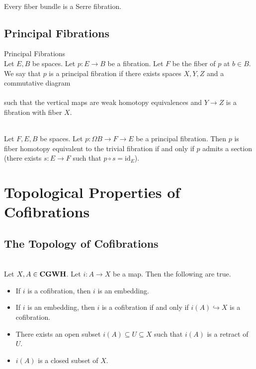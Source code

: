\documentclass[a4paper]{article}
\begin{document}
\begin{lmm}{}{}\\
Every fiber bundle is a Serre fibration. 
\end{lmm}

\subsection{Principal Fibrations}
\begin{defn}{Principal Fibrations}{}\\
Let $E,B$ be spaces. Let $p:E\to B$ be a fibration. Let $F$ be the fiber of $p$ at $b\in B$. We say that $p$ is a principal fibration if there exists spaces $X,Y,Z$ and a commutative diagram \\
\\
such that the vertical maps are weak homotopy equivalences and $Y\to Z$ is a fibration with fiber $X$. 
\end{defn}

\begin{prp}{}{}\\
Let $F,E,B$ be spaces. Let $p:\Omega B\to F\to E$ be a principal fibration. Then $p$ is fiber homotopy equivalent to the trivial fibration if and only if $p$ admits a section (there exists $s:E\to F$ such that $p\circ s=\text{id}_E$). 
\end{prp}

\pagebreak
\section{Topological Properties of Cofibrations}
\subsection{The Topology of Cofibrations}
\begin{prp}{}{}\\
Let $X,A\in\bold{CGWH}$. Let $i:A\to X$ be a map. Then the following are true. 
\begin{itemize}
\item If $i$ is a cofibration, then $i$ is an embedding. 
\item If $i$ is an embedding, then $i$ is a cofibration if and only if $i(A)\hookrightarrow X$ is a cofibration. 
\item There exists an open subset $i(A)\subseteq U\subseteq X$ such that $i(A)$ is a retract of $U$. 
\item $i(A)$ is a closed subset of $X$. 
\end{itemize}
\end{prp}
\end{document}

